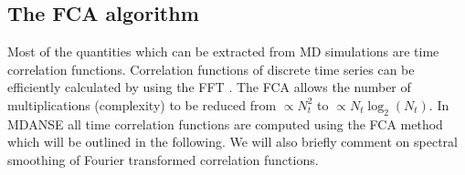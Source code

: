 \documentclass[a4paper,11pt]{article}
\begin{document}
\newpage
\appendix
\appendixpage
\addappheadtotoc
\begin{appendices}
\section{The FCA algorithm}
\label{fca}
Most of the quantities which can be extracted from \gls{MD} simulations are time correlation functions.
Correlation functions of discrete time series can be efficiently calculated by using the \gls{FFT} \cite{Brigham}. The \gls{FCA} allows the number of multiplications (complexity) to be reduced from $\propto N_t^2$ to $\propto N_t \log_2(N_t)$. In
\gls{MDANSE} all time correlation functions are computed using the \gls{FCA} method which will be outlined in the
following. We will also briefly comment on spectral smoothing of Fourier transformed correlation functions.


\end{appendices}
\end{document}
